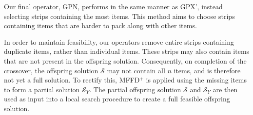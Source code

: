 \documentclass{elsarticle}
\begin{document}
Our final operator, \alert{GPN}, performs in the same manner as \alert{GPX'}, instead selecting strips containing the most items. This method aims to choose strips containing items that are harder to pack along with other items.

In order to maintain feasibility, our operators remove entire strips containing duplicate items, rather than individual items. These strips may also contain items that are not present in the offspring solution. Consequently, on completion of the crossover, the offspring solution $\mathcal{S}$ may not contain all $n$ items, and is therefore not yet a full solution. To rectify this, MFFD$^+$ is applied using the missing items to form a partial solution $\mathcal{S}_Y$. The partial offspring solution $\mathcal{S}$ and $\mathcal{S}_Y$ are then used as input into a local search procedure to create a full feasible offspring solution.
\end{document}
